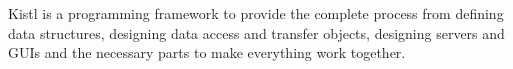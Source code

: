 
Kistl is a programming framework to provide the complete process from
defining data structures, designing data access and transfer objects,
designing servers and GUIs and the necessary parts to make everything
work together.

